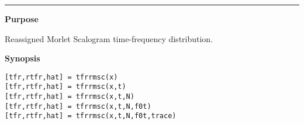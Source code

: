 

\hspace*{-1.6cm}{\Large \bf tfrrmsc}

\vspace*{-.4cm}
\hspace*{-1.6cm}\rule[0in]{16.5cm}{.02cm}
\vspace*{.2cm}

{\bf \large {}\selectfont Purpose}\\
\hspace*{1.5cm}
\begin{minipage}[t]{13.5cm}
Reassigned Morlet Scalogram time-frequency distribution.
\end{minipage}
\vspace*{.2cm}

{\bf \large {}\selectfont Synopsis}\\
\hspace*{1.5cm}
\begin{minipage}[t]{13.5cm}
\begin{verbatim}
[tfr,rtfr,hat] = tfrrmsc(x)
[tfr,rtfr,hat] = tfrrmsc(x,t)
[tfr,rtfr,hat] = tfrrmsc(x,t,N)
[tfr,rtfr,hat] = tfrrmsc(x,t,N,f0t)
[tfr,rtfr,hat] = tfrrmsc(x,t,N,f0t,trace)
\end{verbatim}
\end{minipage}
\vspace*{.5cm}


